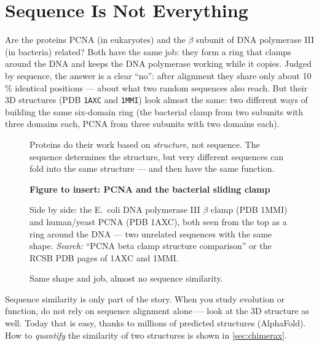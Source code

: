 \documentclass[11pt, oneside]{book}
\newcommand{\seq}[1]{\texttt{#1}}
\newcommand{\figureplaceholder}[5]{%
\begin{figure}[htbp]
\centering
\begin{tcolorbox}[unbreakable,width=\linewidth,height=#1,colback=accent!3,
  colframe=accent!30,boxrule=0.5pt,arc=2.5mm,sharp corners=all,
  valign=center,halign=center,fontupper=\small]
{\bfseries\color{accent}Figure to insert: #2}\par\medskip
{\color{gray!75!black}#3}
\end{tcolorbox}
\caption{#4}\label{#5}
\end{figure}}
\let\originalsection\section
\renewcommand{\section}{\Needspace{7\baselineskip}\originalsection}
\begin{document}
\section{Sequence Is Not Everything}

Are the proteins PCNA (in eukaryotes) and the $\beta$ subunit of DNA
polymerase III (in bacteria) related? Both have the same job: they form a ring
that clamps around the DNA and keeps the DNA polymerase working while it copies.
Judged by sequence, the answer is a clear ``no'': after alignment they share
only about 10\,\% identical positions --- about what two random sequences
also reach. But their 3D structures (PDB \seq{1AXC} and \seq{1MMI}) look
almost the same: two different ways of building the same six-domain ring
(the bacterial clamp from two subunits with three domains each, PCNA from
three subunits with two domains each).

\begin{figure}[htbp]
\centering
{}
\caption{Proteins do their work based on \emph{structure}, not sequence. The
sequence determines the structure, but very different sequences can fold into
the same structure --- and then have the same function.}
\label{fig:seq-struct-fn}
\end{figure}

\figureplaceholder{4.0cm}{PCNA and the bacterial sliding clamp}%
{Side by side: the E.~coli DNA polymerase III $\beta$ clamp (PDB 1MMI) and
human/yeast PCNA (PDB 1AXC), both seen from the top as a ring around the DNA
--- two unrelated sequences with the same shape. \textit{Search:} ``PCNA beta
clamp structure comparison'' or the RCSB PDB pages of 1AXC and 1MMI.}%
{Same shape and job, almost no sequence similarity.}{fig:pcna}

\begin{notebox}[title={Be careful with sequence similarity}]
Sequence similarity is only part of the story. When you study evolution or
function, do not rely on sequence alignment alone --- look at the 3D
structure as well. Today that is easy, thanks to millions of predicted
structures (AlphaFold). How to \emph{quantify} the similarity of two
structures is shown in \cref{sec:chimerax}.
\end{notebox}
\end{document}

